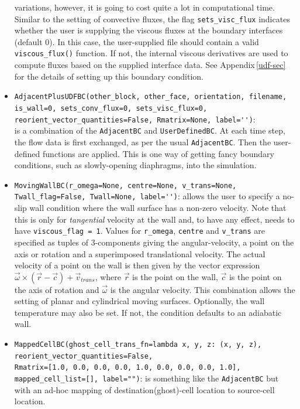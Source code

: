 \begin{itemize}
       variations, however, it is going to cost quite a lot in computational time.
       Similar to the setting of convective fluxes, the flag \verb!sets_visc_flux!
       indicates whether the user is supplying the viscous fluxes at the boundary interfaces (default 0).
       In this case, the user-supplied file should contain a valid \verb!viscous_flux()! function.
       If not, the internal viscous derivatives are used to compute fluxes based on the supplied interface data.
       See Appendix\,\ref{udf-sec} for the details of setting up this boundary condition.
    \item \verb!AdjacentPlusUDFBC(other_block, other_face, orientation, filename,!\\
          \verb!is_wall=0, sets_conv_flux=0, sets_visc_flux=0,! \\
          \verb!reorient_vector_quantities=False, Rmatrix=None, label='')!: \\
       is a combination of the \texttt{AdjacentBC} and \texttt{UserDefinedBC}.
       At each time step, the flow data is first exchanged, as per the usual
       \texttt{AdjacentBC}.  Then the user-defined functions are applied.
       This is one way of getting fancy boundary conditions, such as slowly-opening diaphragms,
       into the simulation.
    \item \verb!MovingWallBC(r_omega=None, centre=None, v_trans=None,!\\
          \verb!Twall_flag=False, Twall=None, label='')!:
       allows the user to specify a no-slip wall condition where the wall surface has a non-zero velocity.
       Note that this is only for \textit{tangential} velocity at the wall and, to have any effect,
       needs to have \verb!viscous_flag = 1!.
       Values for \verb!r_omega!, \verb!centre! and \verb!v_trans! are specified as tuples of 3-components giving
       the angular-velocity, a point on the axis or rotation and a superimposed translational velocity.
       The actual velocity of a point on the wall is then given by the vector expression 
       $\vec{\omega} \times (\vec{r} - \vec{c}) + \vec{v}_{trans}$,
       where $\vec{r}$ is the point on the wall, 
       $\vec{c}$ is the point on the axis of rotation and $\vec{\omega}$ is the angular velocity.
       This combination allows the setting of planar and cylindrical moving surfaces.
       Optionally, the wall temperature may also be set.  If not, the condition defaults to an adiabatic wall.
    \item \verb!MappedCellBC(ghost_cell_trans_fn=lambda x, y, z: (x, y, z),!\\
          \verb!reorient_vector_quantities=False, !\\
          \verb!Rmatrix=[1.0, 0.0, 0.0, 0.0, 1.0, 0.0, 0.0, 0.0, 1.0],!\\
          \verb!mapped_cell_list=[], label="")!:
       is something like the \verb!AdjacentBC! but with an ad-hoc
       mapping of destination(ghost)-cell location to source-cell location.
  \end{itemize}
